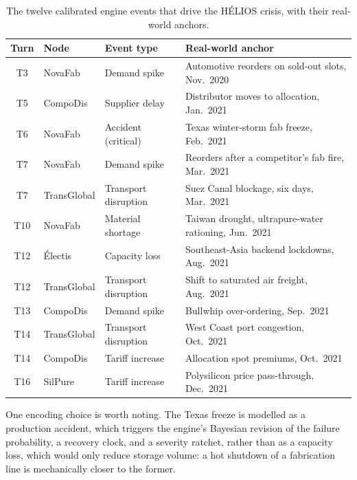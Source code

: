\begin{table}[H]
\centering
\caption{The twelve calibrated engine events that drive the HÉLIOS crisis, with their real-world anchors.}
\label{tab:helios_events}
\small
\begin{tabularx}{\linewidth}{c >{\raggedright\arraybackslash}p{2.3cm} >{\raggedright\arraybackslash}p{2.9cm} X}
\toprule
\textbf{Turn} & \textbf{Node} & \textbf{Event type} & \textbf{Real-world anchor} \\
\midrule
T3 & NovaFab & Demand spike & Automotive reorders on sold-out slots, Nov.\ 2020 \\
T5 & CompoDis & Supplier delay & Distributor moves to allocation, Jan.\ 2021 \\
T6 & NovaFab & Accident (critical) & Texas winter-storm fab freeze, Feb.\ 2021 \\
T7 & NovaFab & Demand spike & Reorders after a competitor's fab fire, Mar.\ 2021 \\
T7 & TransGlobal & Transport disruption & Suez Canal blockage, six days, Mar.\ 2021 \\
T10 & NovaFab & Material shortage & Taiwan drought, ultrapure-water rationing, Jun.\ 2021 \\
T12 & \'Electis & Capacity loss & Southeast-Asia backend lockdowns, Aug.\ 2021 \\
T12 & TransGlobal & Transport disruption & Shift to saturated air freight, Aug.\ 2021 \\
T13 & CompoDis & Demand spike & Bullwhip over-ordering, Sep.\ 2021 \\
T14 & TransGlobal & Transport disruption & West Coast port congestion, Oct.\ 2021 \\
T14 & CompoDis & Tariff increase & Allocation spot premiums, Oct.\ 2021 \\
T16 & SilPure & Tariff increase & Polysilicon price pass-through, Dec.\ 2021 \\
\bottomrule
\end{tabularx}
\end{table}

One encoding choice is worth noting. The Texas freeze is modelled as a production accident, which triggers the engine's Bayesian revision of the failure probability, a recovery clock, and a severity ratchet, rather than as a capacity loss, which would only reduce storage volume: a hot shutdown of a fabrication line is mechanically closer to the former.

